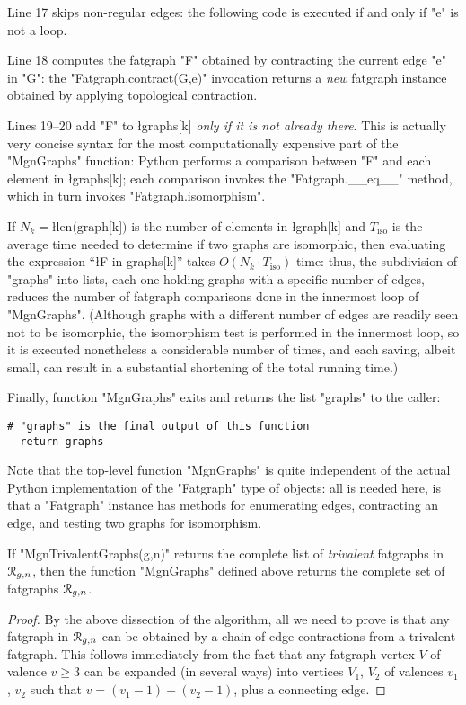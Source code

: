 Line 17 skips non-regular edges: the following code is executed if and
only if "e" is not a loop.

Line 18 computes the fatgraph "F" obtained by contracting the
current edge "e" in "G": the "Fatgraph.contract(G,e)" invocation
returns a \emph{new} fatgraph instance obtained by applying
topological contraction.

Lines 19--20 add "F" to \l{graphs[k]} \emph{only if it is not
  already there}.  This is actually very concise syntax for the most
computationally expensive part of the "MgnGraphs" function: Python
performs a comparison between "F" and each element in \l{graphs[k]};
each comparison invokes the "Fatgraph.__eq__" method, which in turn
invokes "Fatgraph.isomorphism".

If $N_k = \text{\l{len(graph[k])}}$ is the number of elements in
\l{graph[k]} and $T_\text{iso}$ is the average time needed to
determine if two graphs are isomorphic, then evaluating the expression
``\l{F in graphs[k]}'' takes $O(N_k \cdot T_\text{iso})$ time: thus, the
subdivision of "graphs" into lists, each one holding graphs with a
specific number of edges, reduces the number of fatgraph comparisons
done in the innermost loop of "MgnGraphs".  (Although graphs with a
different number of edges are readily seen not to be isomorphic, the
isomorphism test is performed in the innermost loop, so it is executed
nonetheless a considerable number of times, and each saving, albeit
small, can result in a substantial shortening of the total running
time.)

Finally, function "MgnGraphs" exits and returns the list "graphs" to the
caller:
\begin{lstlisting}[name=MgnGraphs,firstnumber=21]
  # "graphs" is the final output of this function
  return graphs
\end{lstlisting}

Note that the top-level function "MgnGraphs" is quite independent of
the actual Python implementation of the "Fatgraph" type of objects:
all is needed here, is that a "Fatgraph" instance has methods for
enumerating edges, contracting an edge, and testing two graphs for
isomorphism.

\begin{lemma}
  If "MgnTrivalentGraphs(g,n)" returns the complete list of
  \emph{trivalent} fatgraphs in $\mathcal{R}_{g,n}$, then the function
  "MgnGraphs" defined above returns the complete set of fatgraphs
  $\mathcal{R}_{g,n}$.
\end{lemma}
\begin{proof}
  By the above dissection of the algorithm, all we need to prove is
  that any fatgraph in $\mathcal{R}_{g,n}$ can be obtained by a chain of edge
  contractions from a trivalent fatgraph.  This follows immediately
  from the fact that any fatgraph vertex $V$ of valence $v \geq 3$ can
  be expanded (in several ways) into vertices $V_1$, $V_2$ of valences
  $v_1$, $v_2$ such that $v = (v_1 -1) + (v_2 -1)$, plus a connecting
  edge.
\end{proof}


